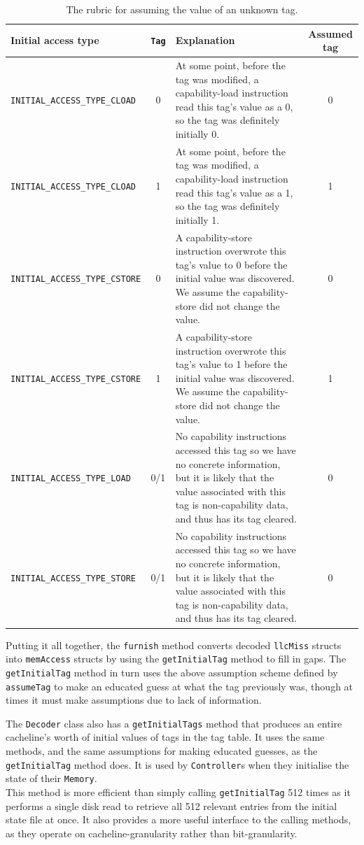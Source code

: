 \begin{table}[H]
	\centering
	\begin{tabular}{|l|c|p{7cm}|c|}
		\hline
		\textbf{Initial access type} & \texttt{Tag} & \textbf{Explanation} & \textbf{Assumed tag}\\
		\hline
		\texttt{INITIAL\_ACCESS\_TYPE\_CLOAD} & 0 & At some point, before the tag was modified, a capability-load instruction read this tag's value as a 0, so the tag was definitely initially 0. & 0\\
		\hline
		\texttt{INITIAL\_ACCESS\_TYPE\_CLOAD} & 1 & At some point, before the tag was modified, a capability-load instruction read this tag's value as a 1, so the tag was definitely initially 1. & 1\\
		\hline
		\texttt{INITIAL\_ACCESS\_TYPE\_CSTORE} & 0 & A capability-store instruction overwrote this tag's value to 0 before the initial value was discovered. We assume the capability-store did not change the value. & 0\\
		\hline
		\texttt{INITIAL\_ACCESS\_TYPE\_CSTORE} & 1 & A capability-store instruction overwrote this tag's value to 1 before the initial value was discovered. We assume the capability-store did not change the value. & 1\\
		\hline
		\texttt{INITIAL\_ACCESS\_TYPE\_LOAD} & 0/1 & No capability instructions accessed this tag so we have no concrete information, but it is likely that the value associated with this tag is non-capability data, and thus has its tag cleared. & 0\\
		\hline
		\texttt{INITIAL\_ACCESS\_TYPE\_STORE} & 0/1 & No capability instructions accessed this tag so we have no concrete information, but it is likely that the value associated with this tag is non-capability data, and thus has its tag cleared. & 0\\
		\hline
	\end{tabular}
	\caption{The rubric for assuming the value of an unknown tag.}
	\label{tab:tar}
\end{table}

Putting it all together, the \texttt{furnish} method converts decoded \texttt{llcMiss} structs into \texttt{memAccess} structs by using the \texttt{getInitialTag} method to fill in gaps. The \texttt{getInitialTag} method in turn uses the above assumption scheme defined by \texttt{assumeTag} to make an educated guess at what the tag previously was, though at times it must make assumptions due to lack of information.

The \texttt{Decoder} class also has a \texttt{getInitialTags} method that produces an entire cacheline's worth of initial values of tags in the tag table. It uses the same methods, and the same assumptions for making educated guesses, as the \texttt{getInitialTag} method does. It is used by \texttt{Controller}s when they initialise the state of their \texttt{Memory}.\\
This method is more efficient than simply calling \texttt{getInitialTag} 512 times as it performs a single disk read to retrieve all 512 relevant entries from the initial state file at once. It also provides a more useful interface to the calling methods, as they operate on cacheline-granularity rather than bit-granularity.


